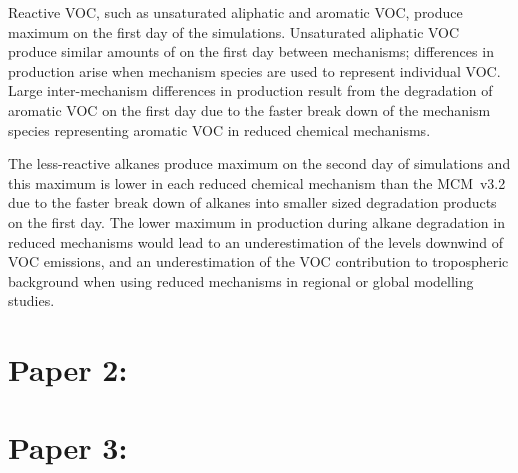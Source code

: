 Reactive VOC, such as unsaturated aliphatic and aromatic VOC, produce maximum  on the first day of the simulations.
Unsaturated aliphatic VOC produce similar amounts of  on the first day between mechanisms; differences in  production arise when mechanism species are used to represent individual VOC.
Large inter-mechanism differences in  production result from the degradation of aromatic VOC on the first day due to the faster break down of the mechanism species representing aromatic VOC in reduced chemical mechanisms.

The less-reactive alkanes produce maximum  on the second day of simulations and this maximum is lower in each reduced chemical mechanism than the MCM~v3.2 due to the faster break down of alkanes into smaller sized degradation products on the first day.
The lower maximum in  production during alkane degradation in reduced mechanisms would lead to an underestimation of the  levels downwind of VOC emissions, and an underestimation of the VOC contribution to tropospheric background  when using reduced mechanisms in regional or global modelling studies.

\section{Paper 2: }

\section{Paper 3: }

